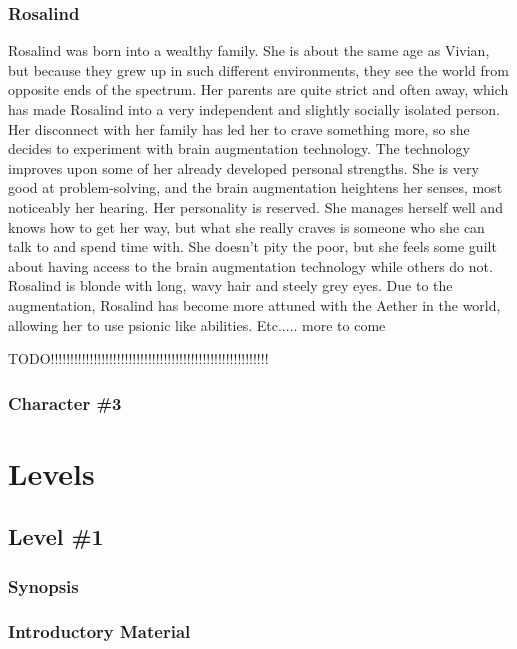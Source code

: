 \documentclass[12pt,titlepage]{article}
\newcommand\tab[1][.5in]{\hspace*{#1}}
\begin{document}
\subsubsection{Rosalind}
\tab Rosalind was born into a wealthy family. She is about the same age as Vivian, but because 
they grew up in such different environments, they see the world from opposite ends of the 
spectrum. Her parents are quite strict and often away, which has made Rosalind into a very 
independent and slightly socially isolated person. Her disconnect with her family has led 
her to crave something more, so she decides to experiment with brain augmentation 
technology. The technology improves upon some of her already developed personal 
strengths. She is very good at problem-solving, and the brain augmentation heightens her 
senses, most noticeably her hearing. Her personality is reserved. She manages herself 
well and knows how to get her way, but what she really craves is someone who she can 
talk to and spend time with. She doesn't pity the poor, but she feels some guilt about 
having access to the brain augmentation technology while others do not. Rosalind is 
blonde with long, wavy hair and steely grey eyes. Due to the augmentation, Rosalind has become more attuned with the Aether in the world, allowing her to use psionic like abilities. Etc..... more to come



TODO!!!!!!!!!!!!!!!!!!!!!!!!!!!!!!!!!!!!!!!!!!!!!!!!!!!!!!!!

\subsubsection{Character \#3}

\newpage
\section{Levels}

\subsection{Level \#1}

\subsubsection{Synopsis}

\subsubsection{Introductory Material}
\end{document}
